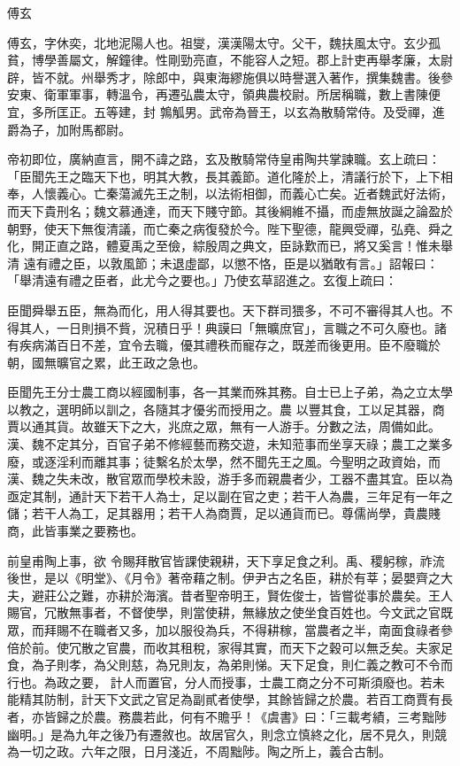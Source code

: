 
\begin{pinyinscope}
傅玄



 傅玄，字休奕，北地泥陽人也。祖燮，漢漢陽太守。父干，魏扶風太守。玄少孤貧，博學善屬文，解鐘律。性剛勁亮直，不能容人之短。郡上計吏再舉孝廉，太尉辟，皆不就。州舉秀才，除郎中，與東海繆施俱以時譽選入著作，撰集魏書。後參安東、衛軍軍事，轉溫令，再遷弘農太守，領典農校尉。所居稱職，數上書陳便宜，多所匡正。五等建，封
 鶉觚男。武帝為晉王，以玄為散騎常侍。及受禪，進爵為子，加附馬都尉。



 帝初即位，廣納直言，開不諱之路，玄及散騎常侍皇甫陶共掌諫職。玄上疏曰：「臣聞先王之臨天下也，明其大教，長其義節。道化隆於上，清議行於下，上下相奉，人懷義心。亡秦蕩滅先王之制，以法術相御，而義心亡矣。近者魏武好法術，而天下貴刑名；魏文慕通達，而天下賤守節。其後綱維不攝，而虛無放誕之論盈於朝野，使天下無復清議，而亡秦之病復發於今。陛下聖德，龍興受禪，弘堯、舜之化，開正直之路，體夏禹之至儉，綜殷周之典文，臣詠歎而已，將又奚言！惟未舉清
 遠有禮之臣，以敦風節；未退虛鄙，以懲不恪，臣是以猶敢有言。」詔報曰：「舉清遠有禮之臣者，此尤今之要也。」乃使玄草詔進之。玄復上疏曰：



 臣聞舜舉五臣，無為而化，用人得其要也。天下群司猥多，不可不審得其人也。不得其人，一日則損不貲，況積日乎！典謨曰「無曠庶官」，言職之不可久廢也。諸有疾病滿百日不差，宜令去職，優其禮秩而寵存之，既差而後更用。臣不廢職於朝，國無曠官之累，此王政之急也。



 臣聞先王分士農工商以經國制事，各一其業而殊其務。自士已上子弟，為之立太學以教之，選明師以訓之，各隨其才優劣而授用之。農
 以豐其食，工以足其器，商賈以通其貨。故雖天下之大，兆庶之眾，無有一人游手。分數之法，周備如此。漢、魏不定其分，百官子弟不修經藝而務交遊，未知蒞事而坐享天祿；農工之業多廢，或逐淫利而離其事；徒繫名於太學，然不聞先王之風。今聖明之政資始，而漢、魏之失未改，散官眾而學校未設，游手多而親農者少，工器不盡其宜。臣以為亟定其制，通計天下若干人為士，足以副在官之吏；若干人為農，三年足有一年之儲；若干人為工，足其器用；若干人為商賈，足以通貨而已。尊儒尚學，貴農賤商，此皆事業之要務也。



 前皇甫陶上事，欲
 令賜拜散官皆課使親耕，天下享足食之利。禹、稷躬稼，祚流後世，是以《明堂》、《月令》著帝藉之制。伊尹古之名臣，耕於有莘；晏嬰齊之大夫，避莊公之難，亦耕於海濱。昔者聖帝明王，賢佐俊士，皆嘗從事於農矣。王人賜官，冗散無事者，不督使學，則當使耕，無緣放之使坐食百姓也。今文武之官既眾，而拜賜不在職者又多，加以服役為兵，不得耕稼，當農者之半，南面食祿者參倍於前。使冗散之官農，而收其租稅，家得其實，而天下之穀可以無乏矣。夫家足食，為子則孝，為父則慈，為兄則友，為弟則悌。天下足食，則仁義之教可不令而行也。為政之要，
 計人而置官，分人而授事，士農工商之分不可斯須廢也。若未能精其防制，計天下文武之官足為副貳者使學，其餘皆歸之於農。若百工商賈有長者，亦皆歸之於農。務農若此，何有不贍乎！《虞書》曰：「三載考績，三考黜陟幽明。」是為九年之後乃有遷敘也。故居官久，則念立慎終之化，居不見久，則競為一切之政。六年之限，日月淺近，不周黜陟。陶之所上，義合古制。




\end{pinyinscope}
